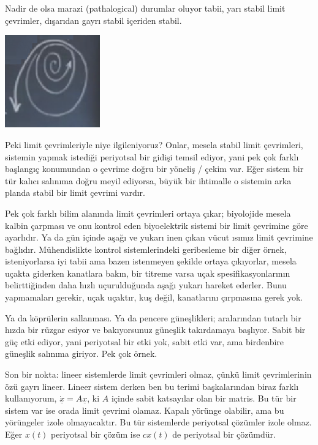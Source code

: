 \documentclass[12pt,fleqn]{article}\usepackage{../../common}
\begin{document}
Nadir de olsa marazi (pathalogical) durumlar oluyor tabii, yarı stabil limit
çevrimler, dışarıdan gayrı stabil içeriden stabil.

\includegraphics[height=4cm]{08_39.png}

Peki limit çevrimleriyle niye ilgileniyoruz? Onlar, mesela stabil limit
çevrimleri, sistemin yapmak istediği periyotsal bir gidişi temsil ediyor, yani
pek çok farklı başlangıç konumundan o çevrime doğru bir yöneliş / çekim
var. Eğer sistem bir tür kalıcı salınıma doğru meyil ediyorsa, büyük bir
ihtimalle o sistemin arka planda stabil bir limit çevrimi vardır. 

Pek çok farklı bilim alanında limit çevrimleri ortaya çıkar; biyolojide mesela
kalbin çarpması ve onu kontrol eden biyoelektrik sistemi bir limit çevrimine
göre ayarlıdır. Ya da gün içinde aşağı ve yukarı inen çıkan vücut ısımız limit
çevrimine bağlıdır. Mühendislikte kontrol sistemlerindeki geribesleme bir diğer
örnek, isteniyorlarsa iyi tabii ama bazen istenmeyen şekilde ortaya çıkıyorlar,
mesela uçakta giderken kanatlara bakın, bir titreme varsa uçak
spesifikasyonlarının belirttiğinden daha hızlı uçurulduğunda aşağı yukarı
hareket ederler. Bunu yapmamaları gerekir, uçak uçaktır, kuş değil, kanatlarını
çırpmasına gerek yok.

Ya da köprülerin sallanması. Ya da pencere güneşlikleri; aralarından tutarlı bir
hızda bir rüzgar esiyor ve bakıyorsunuz güneşlik takırdamaya başlıyor. Sabit bir
güç etki ediyor, yani periyotsal bir etki yok, sabit etki var, ama birdenbire
güneşlik salınıma giriyor. Pek çok örnek.

Son bir nokta: lineer sistemlerde limit çevrimleri olmaz, çünkü limit
çevrimlerinin özü gayrı lineer. Lineer sistem derken ben bu terimi başkalarından
biraz farklı kullanıyorum, $\dot{\underline{x}} = A \underline{x}$, ki
$A$ içinde sabit katsayılar olan bir matris. Bu tür bir sistem var ise orada
limit çevrimi olamaz. Kapalı yörünge olabilir, ama bu yörüngeler izole
olmayacaktır. Bu tür sistemlerde periyotsal çözümler izole olmaz. Eğer $x(t)$
periyotsal bir çözüm ise $c x(t)$ de periyotsal bir çözümdür.
\end{document}
